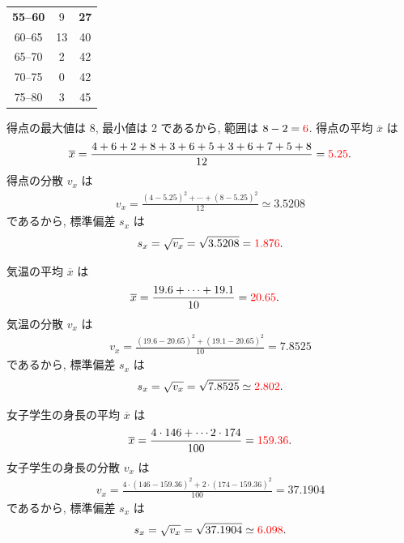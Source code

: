 \begin{qenumerate}
{\begin{table}[H]
\begin{tabular}{c|c|c}
				\textbf{55--60} &  9 & \textbf{27} \\
				60--65 & 13 & 40 \\
				65--70 &  2 & 42 \\
				70--75 &  0 & 42 \\
				75--80 &  3 & 45 \\ \hline
			\end{tabular}
		\end{table}
	}
	\item{
		得点の最大値は 8, 最小値は 2 であるから, 範囲は $8 - 2 = \textcolor{red}{6}$.
		得点の平均 $\overline{x}$ は
		\begin{align}
			\overline{x} = \frac{4 + 6 + 2 + 8 + 3 + 6 + 5 + 3 + 6 + 7 + 5 + 8}{12} = \textcolor{red}{5.25}.
		\end{align}
		得点の分散 $v_{x}$ は
		\begin{align}
			v_{x} = \frac{(4 - 5.25)^{2} + \cdots + (8 - 5.25)^{2}}{12} \simeq 3.5208
		\end{align}
		であるから, 標準偏差 $s_{x}$ は
		\begin{align}
			s_{x} = \sqrt{v_{x}} = \sqrt{3.5208} = \textcolor{red}{1.876}.
		\end{align}
	}
	\item{
		気温の平均 $\overline{x}$ は
		\begin{align}
			\overline{x} &= \frac{19.6 + \cdots + 19.1}{10} = \textcolor{red}{20.65}.
		\end{align}
		気温の分散 $v_{x}$ は
		\begin{align}
			v_{x} = \frac{(19.6 - 20.65)^{2} + (19.1 - 20.65)^{2}}{10} = 7.8525
		\end{align}
		であるから, 標準偏差 $s_{x}$ は
		\begin{align}
			s_{x} = \sqrt{v_{x}} = \sqrt{7.8525} \simeq \textcolor{red}{2.802}.
		\end{align}
	}
	\item{
		女子学生の身長の平均 $\overline{x}$ は
		\begin{align}
			\overline{x} = \frac{4\cdot 146 + \cdots 2\cdot 174}{100} = \textcolor{red}{159.36}.
		\end{align}
		女子学生の身長の分散 $v_{x}$ は
		\begin{align}
			v_{x} = \frac{4\cdot (146 - 159.36)^{2} + 2\cdot (174 - 159.36)^{2}}{100} = 37.1904
		\end{align}
		であるから, 標準偏差 $s_{x}$ は
		\begin{align}
			s_{x} = \sqrt{v_{x}} = \sqrt{37.1904} \simeq \textcolor{red}{6.098}.
		\end{align}
	}
\end{qenumerate}

